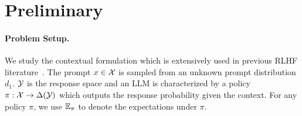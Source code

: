 \section{Preliminary}\label{sec:prelim}
\paragraph{Problem Setup.} We study the contextual formulation which is extensively used in previous RLHF literature~\citep{rafailov2024direct,xiong2024iterative}. The prompt $x \in \mathcal X$ is sampled from an unknown prompt distribution $d_1$. $\mathcal Y$ is the response space and an LLM is characterized by a policy $\pi:\mathcal X \rightarrow \Delta(\mathcal Y)$ which outputs the response probability given the context. For any policy $\pi$, we use $\mathbb{E}_{\pi}$ to denote the expectations under $\pi$. 


